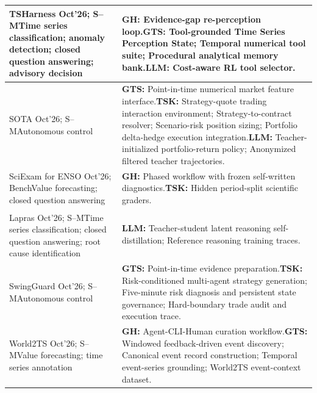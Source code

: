 \documentclass[preprints,article,submit,moreauthors]{Definitions/mdpi}
\newcommand{\typeSMshort}{\textsf{S--M}}
\newcommand{\typeBenchshort}{\textsf{Bench}}
\newcommand{\selfclaim}{\textsuperscript{\dag}}
\begin{document}
\begin{longtable}{@{}>{\raggedright\arraybackslash}p{}p{}@{}}
TSHarness \citep{tsharness2026} Oct'26; \typeSMshort{}\newline Time series classification; anomaly detection; closed question answering; advisory decision & \textbf{GH:} Evidence-gap re-perception loop.\newline\textbf{GTS:} Tool-grounded Time Series Perception State; Temporal numerical tool suite; Procedural analytical memory bank.\newline\textbf{LLM:} Cost-aware RL tool selector.\\\midrule
SOTA \citep{sotaoptions2026} Oct'26; \typeSMshort{}\newline Autonomous control & \textbf{GTS:} Point-in-time numerical market feature interface.\newline\textbf{TSK:} Strategy-quote trading interaction environment; Strategy-to-contract resolver; Scenario-risk position sizing; Portfolio delta-hedge execution integration.\newline\textbf{LLM:} Teacher-initialized portfolio-return policy; Anonymized filtered teacher trajectories.\\\midrule
SciExam for ENSO \citep{sciexamenso2026} Oct'26; \typeBenchshort{}\newline Value forecasting; closed question answering & \textbf{GH:} Phased workflow with frozen self-written diagnostics.\newline\textbf{TSK:} Hidden period-split scientific graders.\\\midrule
Lapras \citep{lapras2026}\selfclaim{} Oct'26; \typeSMshort{}\newline Time series classification; closed question answering; root cause identification & \textbf{LLM:} Teacher-student latent reasoning self-distillation; Reference reasoning training traces.\\\midrule
SwingGuard \citep{swingguard2026} Oct'26; \typeSMshort{}\newline Autonomous control & \textbf{GTS:} Point-in-time evidence preparation.\newline\textbf{TSK:} Risk-conditioned multi-agent strategy generation; Five-minute risk diagnosis and persistent state governance; Hard-boundary trade audit and execution trace.\\\midrule
World2TS \citep{world2ts2026} Oct'26; \typeSMshort{}\newline Value forecasting; time series annotation & \textbf{GH:} Agent-CLI-Human curation workflow.\newline\textbf{GTS:} Windowed feedback-driven event discovery; Canonical event record construction; Temporal event-series grounding; World2TS event-context dataset.\\\midrule

\end{longtable}
\end{document}
